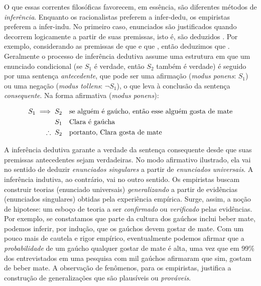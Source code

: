 \documentclass[./main.tex]{subfiles}
\begin{document}
\par O que essas correntes filosóficas favorecem, em essência, são diferentes métodos de \textit{inferência}. Enquanto os racionalistas preferem a \gls{infer-dedu}, os empiristas preferem a \gls{infer-indu}. No primeiro caso, enunciados são justificados quando decorrem logicamente a partir de suas premissas, isto é, são deduzidos \cite{laird2010}. Por exemplo, considerando as premissas de que  e que , então deduzimos que . Geralmente o processo de inferência dedutiva assume uma estrutura em que um enunciado condicional (se $S_1$ é verdade, então $S_2$ também é verdade) é seguido por uma sentença \textit{antecedente}, que pode ser uma afirmação (\textit{modus ponens}: $S_1$) ou uma negação (\textit{modus tollens}: $\neg S_1$), o que leva à conclusão da sentença \textit{consequente}. Na forma afirmativa (\textit{modus ponens}):
\begin{linenomath*}
    \begin{align*}
        S_1 \implies S_2 & \quad \textnormal{se alguém é gaúcho, então esse alguém gosta de mate} \\
        S_1 & \quad \textnormal{Clara é gaúcha}\\
        \therefore\;S_2 & \quad \textnormal{portanto, Clara gosta de mate}
    \end{align*}
\end{linenomath*}
A inferência dedutiva garante a verdade da sentença consequente desde que suas premissas antecedentes sejam verdadeiras. No modo afirmativo ilustrado, ela vai no sentido de deduzir \textit{enunciados singulares} a partir de \textit{enunciados universais}. A inferência indutiva, ao contrário, vai no outro sentido. Os empiristas buscam construir teorias (enunciado universais) \textit{generalizando} a partir de evidências (enunciados singulares) obtidas pela experiência empírica. Surge, assim, a noção de \gls{hipotese}: um esboço de teoria a ser \textit{confirmado} ou \textit{verificado} pelas evidências. Por exemplo, se constatamos que parte da cultura dos gaúchos inclui beber mate, podemos inferir, por indução, que os gaúchos devem gostar de mate. Com um pouco mais de cautela e rigor empírico, eventualmente podemos afirmar que a \textit{probabilidade} de um gaúcho qualquer gostar de mate é alta, uma vez que em 99\% dos entrevistados em uma pesquisa com mil gaúchos afirmaram que sim, gostam de beber mate. A observação de fenômenos, para os empiristas, justifica a construção de generalizações que são plausíveis ou \textit{prováveis}.
\end{document}
